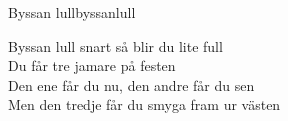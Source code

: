 \begin{song}{Byssan lull}{byssanlull}
\begin{vers}
Byssan lull snart så blir du lite full\\
Du får tre jamare på festen\\
Den ene får du nu, den andre får du sen\\
Men den tredje får du smyga fram ur västen\\
\end{vers}
\end{song}

